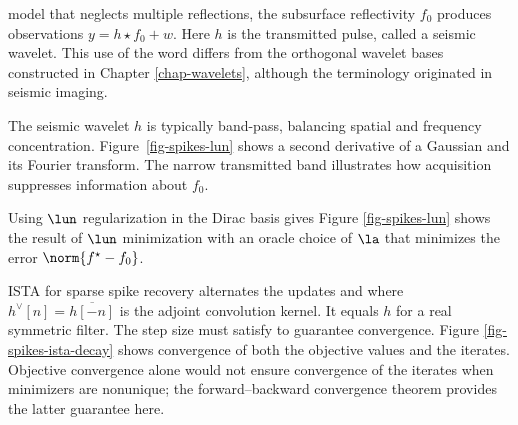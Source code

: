 model that neglects multiple reflections, the subsurface reflectivity $f_0$ produces observations $y=h \star f_0 + w$. Here $h$ is the transmitted pulse, called a seismic wavelet. This use of the word differs from the orthogonal wavelet bases constructed in Chapter \ref{chap-wavelets}, although the terminology originated in seismic imaging.

The seismic wavelet $h$ is typically band-pass, balancing spatial and frequency concentration. Figure~\ref{fig-spikes-lun} shows a second derivative of a Gaussian and its Fourier transform. The narrow transmitted band illustrates how acquisition suppresses information about $f_0$.

            
                                  
      
                       
                     

Using $\lun$ regularization in the Dirac basis gives
Figure \ref{fig-spikes-lun} shows the result of $\lun$ minimization with an oracle choice of $\la$ that minimizes the error $\norm{f^\star-f_0}$.



ISTA for sparse spike recovery alternates the updates
and
where $h^\vee[n]=\overline{h[-n]}$ is the adjoint convolution kernel. It equals $h$ for a real symmetric filter. The step size must satisfy
to guarantee convergence. Figure \ref{fig-spikes-ista-decay} shows convergence of both the objective values and the iterates. Objective convergence alone would not ensure convergence of the iterates when minimizers are nonunique; the forward--backward convergence theorem provides the latter guarantee here.


